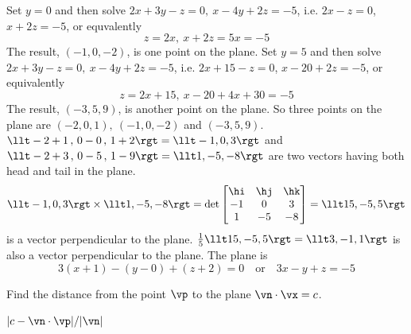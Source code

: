 \begin{solution}
Set $y=0$ and then solve $2x+3y-z=0,\ x-4y+2z=-5$, i.e.
$2x-z=0$, $x+2z=-5$, or equvalently
\begin{equation*}
z=2x,\ x+2z=5x=-5
\end{equation*} 
The result, $(-1,0,-2)$, is one point on the plane. Set $y=5$ and then 
solve $2x+3y-z=0,\ x-4y+2z=-5$, i.e. $2x+15-z=0$, $x-20+2z=-5$,
or equivalently
\begin{equation*}
z=2x+15,\ x-20+4x+30=-5
\end{equation*}
The result, $(-3,5,9)$, is another 
point on the plane. So three points on the plane are $(-2,0,1),
\ (-1,0,-2)$ and $(-3,5,9)$. 
$\llt -2+1\,,\,0-0\,,\, 1+2 \rgt=\llt -1,0,3\rgt$ and 
$\llt -2+3\,,\,0-5\,,\, 1-9 \rgt = \llt 1,-5,-8\rgt$ are two 
vectors having both head and tail in the plane. 
\begin{align*}
\llt -1,0,3\rgt \times  \llt 1,-5,-8\rgt
=\det\left[\begin{matrix}
           \hi & \hj & \hk \\
           -1  &  0  &  3 \\
            1  &  -5 &  -8
  \end{matrix}\right]
=\llt 15 , -5 ,5  \rgt
\end{align*}
is a vector perpendicular to the plane.
$\frac{1}{5}\llt 15 , -5 ,5  \rgt=\llt 3,-1,1\rgt$
is also a vector perpendicular to the plane. The plane is
\begin{equation*}
3(x+1) -(y-0) + (z+2)=0\quad\text{or}\quad
3x-y+z=-5
\end{equation*}
\end{solution}

\begin{question}
Find the distance from the point $\vp$ to the plane $\vn\cdot 
\vx= c$.
\end{question}


\begin{answer}
$|c-\vn\cdot\vp|/|\vn|$
\end{answer}

